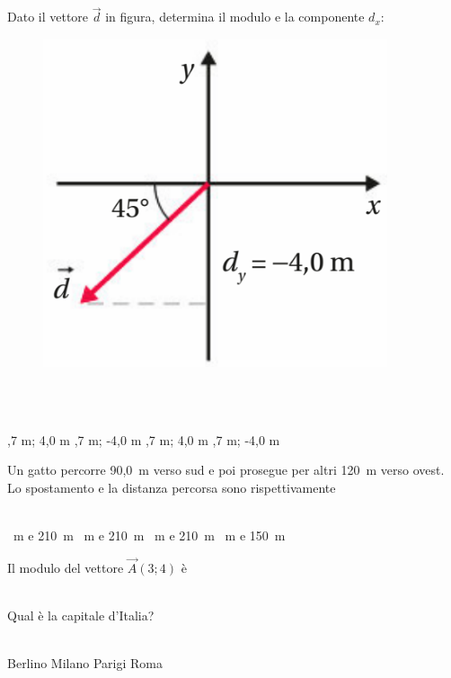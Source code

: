 \documentclass[a4paper,11pt]{exam}
\begin{document}
\begin{questions}
    
\question Dato il vettore $\vec{d}$ in figura, determina il modulo e la componente $d_x$: \begin{figure}[h!]   \begin{center}     \includegraphics[scale=0.35]{vettored.png}   \end{center} \end{figure}\\\
\begin{oneparchoices}
  ,7 m; 4,0 m
  \choice -5,7 m; -4,0 m
  ,7 m; 4,0 m
  \choice 5,7 m; -4,0 m
\end{oneparchoices}

    
\question Un gatto percorre 90,0~m verso sud e poi prosegue per altri 120~m verso ovest. Lo spostamento e la distanza percorsa sono rispettivamente\\\
\begin{oneparchoices}
  ~m e 210~m
  ~m e 210~m
  ~m e 210~m
  \choice 210~m e 150~m
\end{oneparchoices}

    
\question Il modulo del vettore $\vec{A}(3;4)$ è\\\
\begin{oneparchoices}
  \choice 25
  \choice 12
\end{oneparchoices}

    
\question Qual è la capitale d’Italia?\\\
\begin{oneparchoices}
  \choice Berlino
  \choice Milano
  \choice Parigi
  \choice Roma
\end{oneparchoices}


\end{questions}
\end{document}
